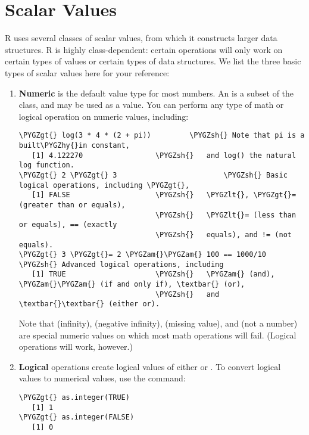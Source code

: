 \documentclass[letterpaper,10pt,english]{sphinxmanual}
\def\PYGZam{\char`\&}
\def\PYGZlt{\char`\<}
\def\PYGZgt{\char`\>}
\def\PYGZsh{\char`\#}
\def\PYGZhy{\char`\-}
\begin{document}
\section{Scalar Values}
\label{6_R_objects:scalar-values}
R uses several classes of scalar values, from which it constructs larger
data structures. R is highly class-dependent: certain operations will
only work on certain types of values or certain types of data
structures. We list the three basic types of scalar values here for your
reference:
\begin{enumerate}
\item {} 
\textbf{Numeric} is the default value type for most numbers. An
 is a subset of the  class, and may be used as
a  value. You can perform any type of math or logical
operation on numeric values, including:

\begin{Verbatim}[commandchars=\\\{\}]
\PYGZgt{} log(3 * 4 * (2 + pi))         \PYGZsh{} Note that pi is a built\PYGZhy{}in constant,
   [1] 4.122270                 \PYGZsh{}   and log() the natural log function.
\PYGZgt{} 2 \PYGZgt{} 3                         \PYGZsh{} Basic logical operations, including \PYGZgt{},
   [1] FALSE                    \PYGZsh{}   \PYGZlt{}, \PYGZgt{}= (greater than or equals),
                                \PYGZsh{}   \PYGZlt{}= (less than or equals), == (exactly
                                \PYGZsh{}   equals), and != (not equals).
\PYGZgt{} 3 \PYGZgt{}= 2 \PYGZam{}\PYGZam{} 100 == 1000/10      \PYGZsh{} Advanced logical operations, including
   [1] TRUE                     \PYGZsh{}   \PYGZam{} (and), \PYGZam{}\PYGZam{} (if and only if), \textbar{} (or),
                                \PYGZsh{}   and \textbar{}\textbar{} (either or).
\end{Verbatim}

Note that  (infinity),  (negative infinity), 
(missing value), and  (not a number) are special numeric
values on which most math operations will fail. (Logical operations
will work, however.)

\item {} 
\textbf{Logical} operations create logical values of either  or
. To convert logical values to numerical values, use the
 command:

\begin{Verbatim}[commandchars=\\\{\}]
\PYGZgt{} as.integer(TRUE)
   [1] 1
\PYGZgt{} as.integer(FALSE)
   [1] 0
\end{Verbatim}


\end{enumerate}
\end{document}
